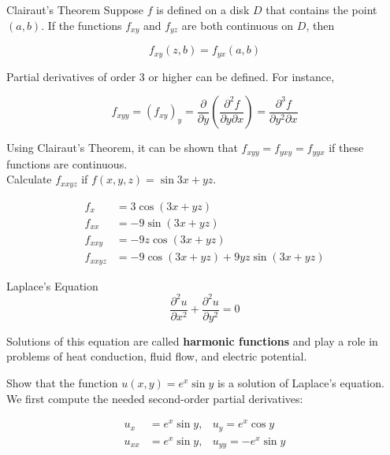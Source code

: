         \begin{theorem}{Clairaut's Theorem}
            Suppose $f$ is defined on a disk $D$ that contains the point $(a,b)$. If the functions $f_{xy}$ and $f_{yz}$ are both continuous on $D$, then

            \[
                f_{xy} (z,b) = f_{yx} (a,b)
            \]
        \end{theorem}

        Partial derivatives of order 3 or higher can be defined. For instance,

        \[
            f_{xyy} = (f_{xy})_y = \frac{\partial}{\partial y}\left(\frac{\partial^2 f}{\partial y \partial x}\right) = \frac{\partial^3 f}{\partial y^2 \partial x}
        \]

        Using Clairaut's Theorem, it can be shown that $f_{xyy} = f_{yxy} = f_{yyx}$ if these functions are continuous. \\

        \textit{} Calculate $f_{xxyz}$ if $f(x,y,z) = \sin{3x+yz}$.

        \begin{align*}
            f_x &= 3\cos{(3x+yz)} \\
            f_{xx}  &= -9\sin{(3x+yz)} \\
            f_{xxy} &= -9z\cos{(3x+yz)} \\
            f_{xxyz}&= -9\cos{(3x+yz)} + 9yz\sin{(3x+yz)}
        \end{align*}

        \begin{axiom}{Laplace's Equation}
            \[
                \frac{\partial^2 u}{\partial x^2} + \frac{\partial^2 u}{\partial y^2} = 0
            \]

            Solutions of this equation are called \textbf{harmonic functions} and play a role in problems of heat conduction, fluid flow, and electric potential.
        \end{axiom}

        \textit{} Show that the function $u(x,y) = e^x \sin{y}$ is a solution of Laplace's equation. \\

        We first compute the needed second-order partial derivatives:

        \begin{align*}
            u_x &= e^x \sin{y}, & u_y = e^x \cos{y} \\
            u_{xx} &= e^x \sin{y}, & u_{yy} = -e^x \sin{y}
        \end{align*}


